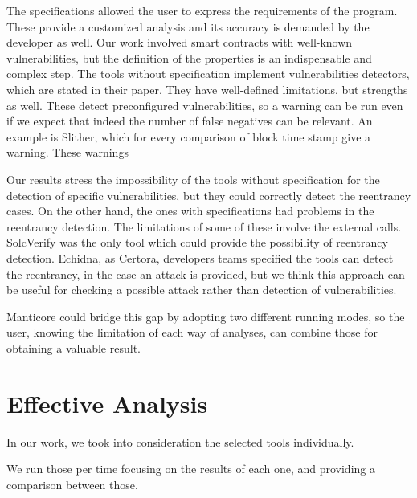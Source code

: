 The specifications allowed the user to express the requirements of the program. These provide a customized analysis and 
its accuracy is demanded by the developer as well. 
Our work involved smart contracts with well-known vulnerabilities, but the definition of the properties is an indispensable and complex step.
The tools without specification implement vulnerabilities detectors, which are stated in their paper. They have well-defined limitations, but strengths as well. These detect preconfigured vulnerabilities, so a warning can be run even if we expect that indeed the number of false negatives can be relevant.
An example is Slither, which for every comparison of block time stamp give a warning. These warnings 

Our results stress the impossibility of the tools without specification for the detection of specific vulnerabilities, but they could correctly detect the reentrancy cases. 
On the other hand, the ones with specifications had problems in the reentrancy detection. The limitations of some of these involve the external calls. 
SolcVerify was the only tool which could provide the possibility of reentrancy detection. Echidna, as Certora, developers teams specified the tools  can detect the reentrancy, in the case an attack is provided, 
but we think this approach can be useful for checking a possible attack rather than detection of vulnerabilities.

Manticore could bridge this gap by adopting two different running modes, so the user, knowing the limitation of each way of analyses, can combine those for obtaining a valuable result.


\section{Effective Analysis}
In our work, we took into consideration the selected tools individually. 

We run those per time focusing on the results of each one, and providing a comparison between those.

